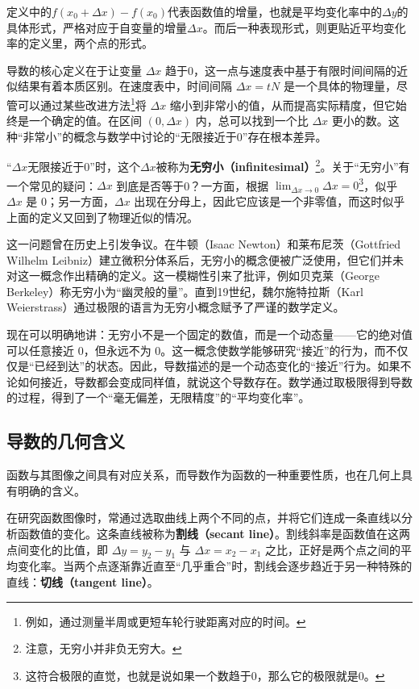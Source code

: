 定义中的$f(x_0+\Delta x)-f(x_0)$代表函数值的增量，也就是平均变化率中的$\Delta y$的具体形式，严格对应于自变量的增量$\Delta x$。而后一种表现形式，则更贴近平均变化率的定义里，两个点的形式。

导数的核心定义在于让变量 $\Delta x$ 趋于0，这一点与速度表中基于有限时间间隔的近似结果有着本质区别。在速度表中，时间间隔 $\Delta x = tN$ 是一个具体的物理量，尽管可以通过某些改进方法\footnote{例如，通过测量半周或更短车轮行驶距离对应的时间。}将 $\Delta x$ 缩小到非常小的值，从而提高实际精度，但它始终是一个确定的值。在区间 $(0, \Delta x)$ 内，总可以找到一个比 $\Delta x$ 更小的数。这种“非常小”的概念与数学中讨论的“无限接近于0”存在根本差异。

“$\Delta x$无限接近于0”时，这个$\Delta x$被称为\textbf{无穷小（infinitesimal）}\footnote{注意，无穷小并非负无穷大。}。关于“无穷小”有一个常见的疑问：$\Delta x$ 到底是否等于0？一方面，根据 $\displaystyle\lim_{\Delta x \to 0} \Delta x = 0$\footnote{这符合极限的直觉，也就是说如果一个数趋于0，那么它的极限就是0。}，似乎 $\Delta x$ 是 0；另一方面，$\Delta x$ 出现在分母上，因此它应该是一个非零值，而这时似乎上面的定义又回到了物理近似的情况。

这一问题曾在历史上引发争议。在牛顿（Isaac Newton）和莱布尼茨（Gottfried Wilhelm Leibniz）建立微积分体系后，无穷小的概念便被广泛使用，但它们并未对这一概念作出精确的定义。这一模糊性引来了批评，例如贝克莱（George Berkeley）称无穷小为“幽灵般的量”。直到19世纪，魏尔施特拉斯（Karl Weierstrass）通过极限的语言为无穷小概念赋予了严谨的数学定义。

现在可以明确地讲：无穷小不是一个固定的数值，而是一个动态量——它的绝对值可以任意接近 0，但永远不为 0。这一概念使数学能够研究“接近”的行为，而不仅仅是“已经到达”的状态。因此，导数描述的是一个动态变化的“接近”行为。如果不论如何接近，导数都会变成同样值，就说这个导数存在。数学通过取极限得到导数的过程，得到了一个“毫无偏差，无限精度”的“平均变化率”。

\subsection{导数的几何含义}\label{sub_HsDerv_1}

函数与其图像之间具有对应关系，而导数作为函数的一种重要性质，也在几何上具有明确的含义。

在研究函数图像时，常通过选取曲线上两个不同的点，并将它们连成一条直线以分析函数值的变化。这条直线被称为\textbf{割线（secant line）}。割线斜率是函数值在这两点间变化的比值，即 $\Delta y = y_2 - y_1$ 与 $\Delta x = x_2 - x_1$ 之比，正好是两个点之间的平均变化率。当两个点逐渐靠近直至“几乎重合”时，割线会逐步趋近于另一种特殊的直线：\textbf{切线（tangent line）}。

